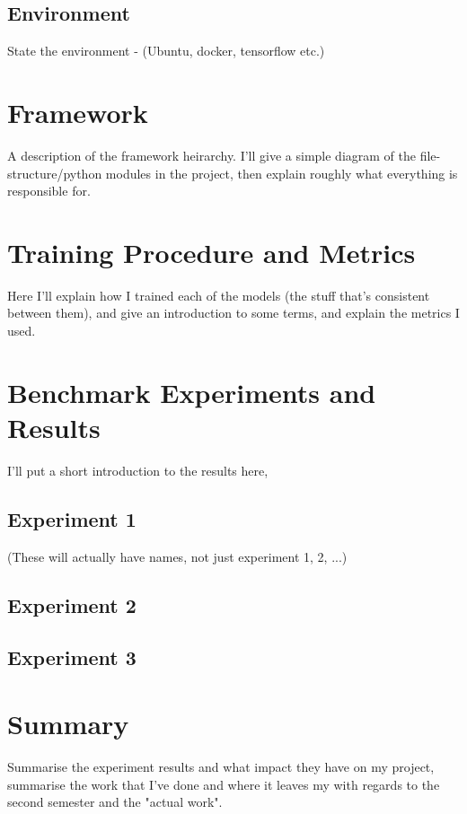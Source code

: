 \documentclass{report}
\begin{document}
	\subsection{Environment}
	State the environment - (Ubuntu, docker, tensorflow etc.)
	
	\section{Framework}
	A description of the framework heirarchy. I'll give a simple diagram of the file-structure/python modules in the project, then explain roughly what everything is responsible for.
	
	\section{Training Procedure and Metrics}
	Here I'll explain how I trained each of the models (the stuff that's consistent between them), and give an introduction to some terms, and explain the metrics I used.
	
	\section{Benchmark Experiments and Results}
	I'll put a short introduction to the results here,
	
	\subsection{Experiment 1}
	(These will actually have names, not just experiment 1, 2, ...)
	\subsection{Experiment 2}
	\subsection{Experiment 3}
		
	\section{Summary}
	Summarise the experiment results and what impact they have on my project, summarise the work that I've done and where it leaves my with regards to the second semester and the "actual work". 
	
	
\end{document}
